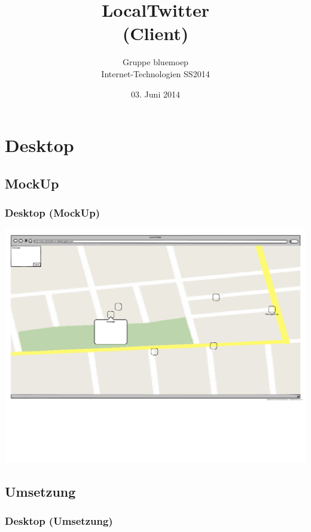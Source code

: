 \documentclass[aspectratio=43]{beamer}
\title{LocalTwitter\\(Client)}
\author{Gruppe bluemoep\\Internet-Technologien SS2014}
\date{03. Juni 2014}
\begin{document}
\frame{\maketitle}
 
\section{Desktop}
\subsection{MockUp}
\begin{frame}
	\frametitle{Desktop (MockUp)}
	\includegraphics[width=\textwidth]{ITDesktopMockUp.pdf}
\end{frame}

\subsection{Umsetzung}
\begin{frame}
	\frametitle{Desktop (Umsetzung)}
\end{frame}
\end{document}
